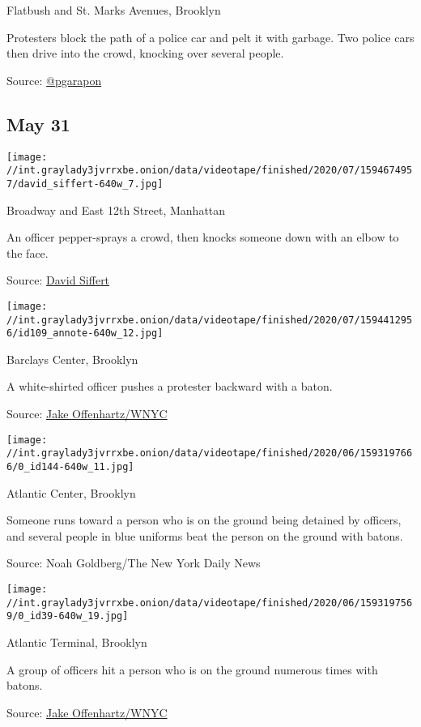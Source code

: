 Flatbush and St. Marks Avenues, Brooklyn

 Protesters block the path of a police car and pelt it with garbage. Two
police cars then drive into the crowd, knocking over several people.

Source:
\href{https://twitter.com/pgarapon/status/1266885414016688134}{@pgarapon}

\hypertarget{may-31}{%
\subsection{May 31}\label{may-31}}

\texttt{[image: //int.graylady3jvrrxbe.onion/data/videotape/finished/2020/07/1594674957/david\_siffert-640w\_7.jpg]}

 Broadway and East 12th Street, Manhattan

 An officer pepper-sprays a crowd, then knocks someone down with an
elbow to the face.

Source:
\href{https://twitter.com/DavidASiffert/status/1267297196157947904}{David
Siffert}

\texttt{[image: //int.graylady3jvrrxbe.onion/data/videotape/finished/2020/07/1594412956/id109\_annote-640w\_12.jpg]}

 Barclays Center, Brooklyn

 A white-shirted officer pushes a protester backward with a baton.

Source:
\href{https://twitter.com/jangelooff/status/1267288506424066048}{Jake
Offenhartz/WNYC}

\texttt{[image: //int.graylady3jvrrxbe.onion/data/videotape/finished/2020/06/1593197666/0\_id144-640w\_11.jpg]}

 Atlantic Center, Brooklyn

 Someone runs toward a person who is on the ground being detained by
officers, and several people in blue uniforms beat the person on the
ground with batons.

Source: Noah Goldberg/The New York Daily News

\texttt{[image: //int.graylady3jvrrxbe.onion/data/videotape/finished/2020/06/1593197569/0\_id39-640w\_19.jpg]}

 Atlantic Terminal, Brooklyn

 A group of officers hit a person who is on the ground numerous times
with batons.

Source:
\href{https://twitter.com/jangelooff/status/1267287782155857923}{Jake
Offenhartz/WNYC}

